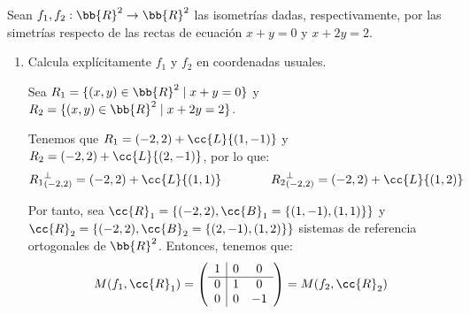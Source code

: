 \begin{ejercicio}
    Sean $f_1, f_2 : \bb{R}^2\to \bb{R}^2$ las isometrías dadas, respectivamente, por las simetrías respecto de las rectas de ecuación $x + y = 0$ y $x + 2y = 2$.
    \begin{figure}[H]
        \centering
    \end{figure}
    \begin{enumerate}
        \item Calcula explícitamente $f_1$ y $f_2$ en coordenadas usuales.
        
        Sea $R_1=\{(x,y)\in \bb{R}^2 \mid x+y=0\}$ y $R_2=\{(x,y)\in \bb{R}^2 \mid x+2y=2\}$.

        Tenemos que $R_1 = (-2,2) + \cc{L}\{(1,-1)\}$ y $R_2 = (-2,2) + \cc{L}\{(2,-1)\}$, por lo que:
        \begin{equation*}
            {R_1}_{(-2,2)}^\perp = (-2,2) + \cc{L}\{(1,1)\} \qquad \qquad {R_2}_{(-2,2)}^\perp = (-2,2) + \cc{L}\{(1, 2)\}
        \end{equation*}

        Por tanto, sea $\cc{R}_1 = \{(-2,2), \cc{B}_1 = \{(1,-1), (1,1)\}\}$ y $\cc{R}_2 = \{(-2,2), \cc{B}_2 = \{(2,-1), (1,2)\}\}$ sistemas de referencia ortogonales de $\bb{R}^2$. Entonces, tenemos que:
        \begin{equation*}
            M(f_1,\cc{R}_1) = \left(\begin{array}{c|cc}
                1 & 0 & 0 \\ \hline
                0 & 1 & 0 \\
                0 & 0 & -1
            \end{array}\right) = M(f_2,\cc{R}_2)
        \end{equation*}


\end{enumerate}
\end{ejercicio}
